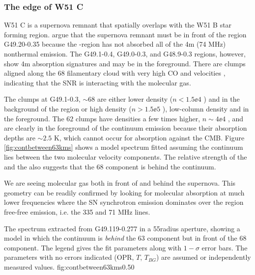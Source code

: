 

\subsubsection{The edge of W51 C}
W51 C is a supernova remnant that spatially overlaps with the W51 B star
forming region.  \citet{Brogan2013a} argue that the supernova remnant must be
in front of the \hii region G49.20-0.35 because the \hii-region has not absorbed
all of the 4m (74 MHz) nonthermal emission.  The G49.1-0.4, G49.0-0.3, and G48.9-0.3
regions, however, show 4m absorption signatures and may be in the foreground.
There are clumps aligned along the 68 \kms filamentary cloud with very high CO
and \hi velocities \citep{Koo1997b,Koo1997c,Brogan2013a}, indicating that the
SNR is interacting with the molecular gas.

The clumps at G49.1-0.3, $\sim68$ \kms are either lower density ($n<1.5\ee{4}$
\percc) and in the background of the \hii region or high density ($n>1.5\ee{5}$
\percc), low-column density and in the foreground.  The $62$ \kms clumps have
densities a few times higher, $n\sim4\ee{4}$ \percc, and are clearly in the
foreground of the continuum emission because their absorption depths are
$\sim2.5$ K, which cannot occur for absorption against the CMB.  Figure
\ref{fig:contbetween63kms} shows a model spectrum fitted assuming the continuum
lies between the two molecular velocity components.  The relative strength of
the \thirteenco and the \formaldehyde also suggests that the 68 \kms component
is behind the continuum.

We are seeing molecular gas both in front of and behind the supernova.  This
geometry can be readily confirmed by looking for molecular absorption at much
lower frequencies where the SN synchrotron emission dominates over the \hii
region free-free emission, i.e. the 335 and 71 MHz \para lines.

{The spectrum extracted from G49.119-0.277 in a 55\arcsec radius aperture,
showing a model in which the continuum is \emph{behind} the 63 \kms component
but in front of the 68 \kms component.  The legend gives the fit parameters
along with $1-\sigma$ error bars.  The parameters with no errors indicated
(OPR, $T$, $T_{BG}$) are assumed or independently measured values.}
{fig:contbetween63kms}{0.5}{0}

